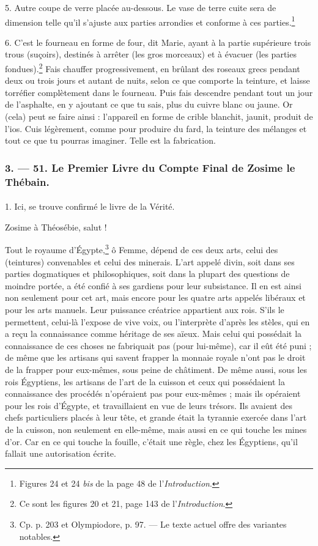 \documentclass[a4paper, 11pt, oneside, polutonikogreek, french]{article}
\begin{document}
5. Autre coupe de verre placée au-dessous. Le vase de terre cuite sera de dimension telle qu'il s'ajuste aux parties arrondies et conforme à ces parties.\footnote{Figures 24 et 24 \emph{bis} de la page 48 de l'\emph{Introduction}.}

6. C'est le fourneau en forme de four, dit Marie, ayant à la partie supérieure trois trous (suçoirs), destinés à arrêter (les gros morceaux) et à évacuer (les parties fondues).\footnote{Ce sont les figures 20 et 21, page 143 de l'\emph{Introduction}.} Fais chauffer progressivement, en brûlant des roseaux grecs pendant deux ou trois jours et autant de nuits, selon ce que comporte la teinture, et laisse torréfier complètement dans le fourneau. Puis fais descendre pendant tout un jour de l'asphalte, en y ajoutant ce que tu sais, plus du cuivre blanc ou jaune. Or (cela) peut se faire ainsi : l'appareil en forme de crible blanchit, jaunit, produit de l'ios. Cuis légèrement, comme pour produire du fard, la teinture des mélanges et tout ce que tu pourras imaginer. Telle est la fabrication.

\bigskip
\centerline{\EightStarTaper}
\centerline{\EightStarTaper\EightStarTaper}
\bigskip

\subsubsection{3. --- 51. Le Premier Livre du Compte Final de Zosime le Thébain.}
\paragraph{}
1. Ici, se trouve confirmé le livre de la Vérité.

Zosime à Théosébie, salut !

Tout le royaume d'Égypte,\footnote{Cp. p. 203 et Olympiodore, p. 97. --- Le texte actuel offre des variantes notables.} ô Femme, dépend de ces deux arts, celui des (teintures) convenables et celui des minerais. L'art appelé divin, soit dans ses parties dogmatiques et philosophiques, soit dans la plupart des questions de moindre portée, a été confié à ses gardiens pour leur subsistance. Il en est ainsi non seulement pour cet art, mais encore pour les quatre arts appelés libéraux et pour les arts manuels. Leur puissance créatrice appartient aux rois. S'ils le permettent, celui-là l'expose de vive voix, ou l'interprète d'après les stèles, qui en a reçu la connaissance comme héritage de ses aïeux. Mais celui qui possédait la connaissance de ces choses ne fabriquait pas (pour lui-même), car il eût été puni ; de même que les artisans qui savent frapper la monnaie royale n'ont pas le droit de la frapper pour eux-mêmes, sous peine de châtiment. De même aussi, sous les rois Égyptiens, les artisans de l'art de la cuisson et ceux qui possédaient la connaissance des procédés n'opéraient pas pour eux-mêmes ; mais ils opéraient pour les rois d'Égypte, et travaillaient en vue de leurs trésors. Ils avaient des chefs particuliers placés à leur tête, et grande était la tyrannie exercée dans l'art de la cuisson, non seulement en elle-même, mais aussi en ce qui touche les mines d'or. Car en ce qui touche la fouille, c'était une règle, chez les Égyptiens, qu'il fallait une autorisation écrite.
\end{document}

